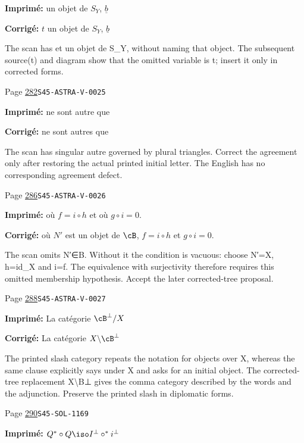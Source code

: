 \begin{description}
\par\noindent\textbf{Imprimé:} un objet de $S_Y$, $\underline b$
\par\noindent\textbf{Corrigé:} $t$ un objet de $S_Y$, $\underline b$
\par\noindent The scan has et un objet de S\_Y, without naming that object. The subsequent source(t) and diagram show that the omitted variable is t; insert it only in corrected forms.
\smallskip
\item[\hypertarget{apparatus:FR-0287}{287}] Page \hyperlink{printpage:fr:282}{282}\quad\texttt{S45-ASTRA-V-0025}
\par\noindent\textbf{Imprimé:} ne sont autre que
\par\noindent\textbf{Corrigé:} ne sont autres que
\par\noindent The scan has singular autre governed by plural triangles. Correct the agreement only after restoring the actual printed initial letter. The English has no corresponding agreement defect.
\smallskip
\item[\hypertarget{apparatus:FR-0288}{288}] Page \hyperlink{printpage:fr:286}{286}\quad\texttt{S45-ASTRA-V-0026}
\par\noindent\textbf{Imprimé:} où $f=i\circ h$ et où $g\circ i=0$.
\par\noindent\textbf{Corrigé:} où $N'$ est un objet de $\cB$, $f=i\circ h$ et $g\circ i=0$.
\par\noindent The scan omits N′∈B. Without it the condition is vacuous: choose N′=X, h=id\_X and i=f. The equivalence with surjectivity therefore requires this omitted membership hypothesis. Accept the later corrected-tree proposal.
\smallskip
\item[\hypertarget{apparatus:FR-0289}{289}] Page \hyperlink{printpage:fr:288}{288}\quad\texttt{S45-ASTRA-V-0027}
\par\noindent\textbf{Imprimé:} La catégorie $\cB^\bot/X$
\par\noindent\textbf{Corrigé:} La catégorie $X\backslash\cB^\bot$
\par\noindent The printed slash category repeats the notation for objects over X, whereas the same clause explicitly says under X and asks for an initial object. The corrected-tree replacement X\textbackslash{}B⊥ gives the comma category described by the words and the adjunction. Preserve the printed slash in diplomatic forms.
\smallskip
\item[\hypertarget{apparatus:FR-0290}{290}] Page \hyperlink{printpage:fr:290}{290}\quad\texttt{S45-SOL-1169}
\par\noindent\textbf{Imprimé:} \(Q^\ast\circ Q\iso I^\bot\circ ^\ast i^\bot\)

\end{description}
